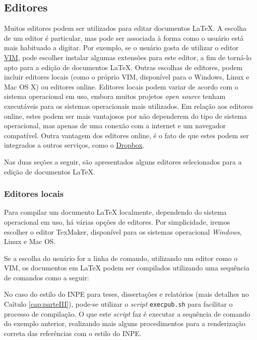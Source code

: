 
\subsection{Editores}
\label{sec:editores}

Muitos editores podem ser utilizados para editar documentos \LaTeX{}. A escolha de um editor é particular, mas pode ser associada à forma como o usuário está mais habituado a digitar. Por exemplo, se o usuário gosta de utilizar o editor \href{https://www.vim.org}{VIM}, pode escolher instalar algumas extensões para este editor, a fim de torná-lo apto para a edição de documentos \LaTeX{}. Outras escolhas de editores, podem incluir editores locais (como o próprio VIM, disponível para o Windows, Linux e Mac OS X) ou editores online. Editores locais podem variar de acordo com o sistema operacional em uso, embora muitos projetos \textit{open source} tenham executáveis para os sistemas operacionais mais utilizados. Em relação aos editores online, estes podem ser mais vantajosos por não dependerem do tipo de sistema operacional, mas apenas de uma conexão com a internet e um navegador compatível. Outra vantagem dos editores online, é o fato de que estes podem ser integrados a outros serviços, como o \href{https://dropbox.com}{Dropbox}.

Nas duas seções a seguir, são apresentados alguns editores selecionados para a edição de documentos \LaTeX{}.

\subsubsection*{Editores locais}
\label{sec:ed_local}

Para compilar um documento \LaTeX{} localmente, dependendo do sistema operacional em uso, há várias opções de editores. Por simplicidade, iremos escolher o editor TexMaker, disponível para os sistemas operacional \textit{Windows}, Linux e Mac OS.

Se a escolha do usuário for a linha de comando, utilizando um editor como o VIM, os documentos em \LaTeX{} podem ser compilados utilizando uma sequência de comandos como a seguir:

No caso do estilo do INPE para teses, dissertações e relatórios (mais detalhes no Caítulo \ref{cap:parteIII}), pode-se utilizar o \textit{script} {\tt execpub.sh} para facilitar o processo de compilação. O que este \textit{script} faz é executar a sequência de comando do exemplo anterior, realizando mais alguns procedimentos para a renderização correta das referências com o estilo do INPE. 

